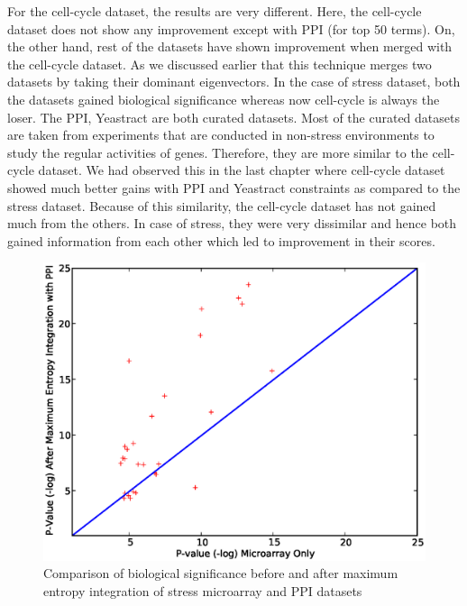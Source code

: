 For the cell-cycle dataset, the results are very different. Here, the cell-cycle dataset does not show any improvement except with PPI (for top 50 terms). On, the other hand, rest of the datasets have shown improvement when merged with the cell-cycle dataset. As we discussed earlier that this technique merges two datasets by taking their dominant eigenvectors. In the case of stress dataset, both the datasets gained biological significance whereas now cell-cycle is always the loser. The PPI, Yeastract are both curated datasets. Most of the curated datasets are taken from experiments that are conducted in non-stress environments to study the regular activities of genes. Therefore, they are more similar to the cell-cycle dataset. We had observed this in the last chapter where cell-cycle dataset showed much better gains with PPI and Yeastract constraints as compared to the stress dataset. Because of this similarity, the cell-cycle dataset has not gained much from the others. In case of stress, they were very dissimilar and hence both gained information from each other which led to improvement in their scores.    
\begin{figure}
\begin{center}
\includegraphics[scale=0.55]{chapter3/stress_ppi_maxent.eps}
\end{center}    
\caption{Comparison of biological significance before and after maximum entropy integration of stress microarray and PPI datasets}
\label{fig:maxent_biol_valid}
\end{figure}

